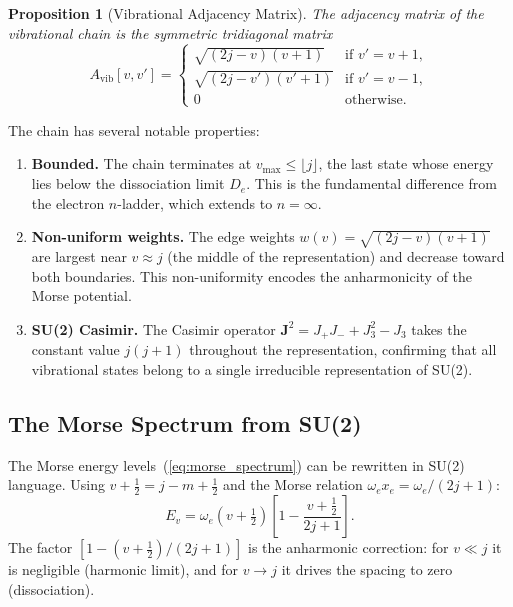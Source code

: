 \documentclass[aps,pra,twocolumn,superscriptaddress,longbibliography]{revtex4-2}
\newtheorem{proposition}{Proposition}
\begin{document}
\begin{proposition}[Vibrational Adjacency Matrix]
The adjacency matrix of the vibrational chain is the symmetric
tridiagonal matrix
\begin{equation}
A_{\mathrm{vib}}[v, v'] = \begin{cases}
\sqrt{(2j - v)(v + 1)} & \text{if } v' = v + 1, \\
\sqrt{(2j - v')(v' + 1)} & \text{if } v' = v - 1, \\
0 & \text{otherwise.}
\end{cases}
\label{eq:avib}
\end{equation}
\end{proposition}

The chain has several notable properties:
\begin{enumerate}
\item \textbf{Bounded.}  The chain terminates at
$v_{\max} \leq \lfloor j \rfloor$, the last state whose energy lies
below the dissociation limit $D_e$.  This is the fundamental difference
from the electron $n$-ladder, which extends to $n = \infty$.

\item \textbf{Non-uniform weights.}  The edge weights
$w(v) = \sqrt{(2j-v)(v+1)}$ are largest near $v \approx j$ (the middle
of the representation) and decrease toward both boundaries.  This
non-uniformity encodes the anharmonicity of the Morse potential.

\item \textbf{SU(2) Casimir.}  The Casimir operator
$\mathbf{J}^2 = J_+ J_- + J_3^2 - J_3$ takes the constant value
$j(j+1)$ throughout the representation, confirming that all vibrational
states belong to a single irreducible representation of SU(2).
\end{enumerate}

\subsection{The Morse Spectrum from SU(2)}

The Morse energy levels~(\ref{eq:morse_spectrum}) can be rewritten in
SU(2) language.  Using $v + \tfrac{1}{2} = j - m + \tfrac{1}{2}$ and
the Morse relation $\omega_e x_e = \omega_e/(2j+1)$:
\begin{equation}
E_v = \omega_e\left(v + \tfrac{1}{2}\right)
\left[1 - \frac{v + \tfrac{1}{2}}{2j + 1}\right].
\label{eq:morse_su2}
\end{equation}
The factor $[1 - (v+\tfrac{1}{2})/(2j+1)]$ is the anharmonic
correction: for $v \ll j$ it is negligible (harmonic limit), and for
$v \to j$ it drives the spacing to zero (dissociation).
\end{document}
